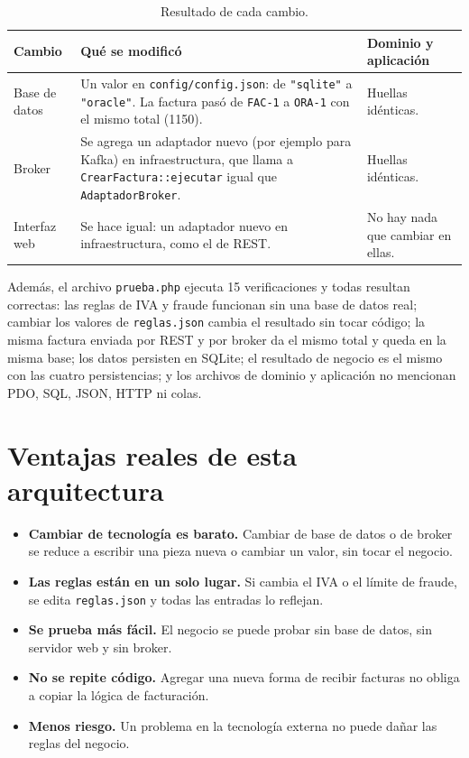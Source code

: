 \documentclass[10.5pt]{article}
\begin{document}
\begin{table}[h]
\centering
\begin{tabular}{p{3cm}p{8cm}p{4.5cm}}
\toprule
\textbf{Cambio} & \textbf{Qué se modificó} & \textbf{Dominio y aplicación} \\
\midrule
Base de datos &
Un valor en \texttt{config/config.json}: de \texttt{"sqlite"} a \texttt{"oracle"}. La factura
pasó de \texttt{FAC-1} a \texttt{ORA-1} con el mismo total (1150). &
Huellas idénticas. \\
\addlinespace
Broker &
Se agrega un adaptador nuevo (por ejemplo para Kafka) en infraestructura, que llama a
\texttt{CrearFactura::ejecutar} igual que \texttt{AdaptadorBroker}. &
Huellas idénticas. \\
\addlinespace
Interfaz web &
Se hace igual: un adaptador nuevo en infraestructura, como el de REST. &
No hay nada que cambiar en ellas. \\
\bottomrule
\end{tabular}
\caption{Resultado de cada cambio.}
\end{table}

Además, el archivo \texttt{prueba.php} ejecuta 15 verificaciones y todas resultan correctas:
las reglas de IVA y fraude funcionan sin una base de datos real; cambiar los valores de
\texttt{reglas.json} cambia el resultado sin tocar código; la misma factura enviada por REST y
por broker da el mismo total y queda en la misma base; los datos persisten en SQLite; el
resultado de negocio es el mismo con las cuatro persistencias; y los archivos de dominio y
aplicación no mencionan PDO, SQL, JSON, HTTP ni colas.

\section{Ventajas reales de esta arquitectura}
\begin{itemize}
\item \textbf{Cambiar de tecnología es barato.} Cambiar de base de datos o de broker se reduce a
escribir una pieza nueva o cambiar un valor, sin tocar el negocio.
\item \textbf{Las reglas están en un solo lugar.} Si cambia el IVA o el límite de fraude, se
edita \texttt{reglas.json} y todas las entradas lo reflejan.
\item \textbf{Se prueba más fácil.} El negocio se puede probar sin base de datos, sin servidor
web y sin broker.
\item \textbf{No se repite código.} Agregar una nueva forma de recibir facturas no obliga a
copiar la lógica de facturación.
\item \textbf{Menos riesgo.} Un problema en la tecnología externa no puede dañar las reglas del
negocio.
\end{itemize}
\end{document}
